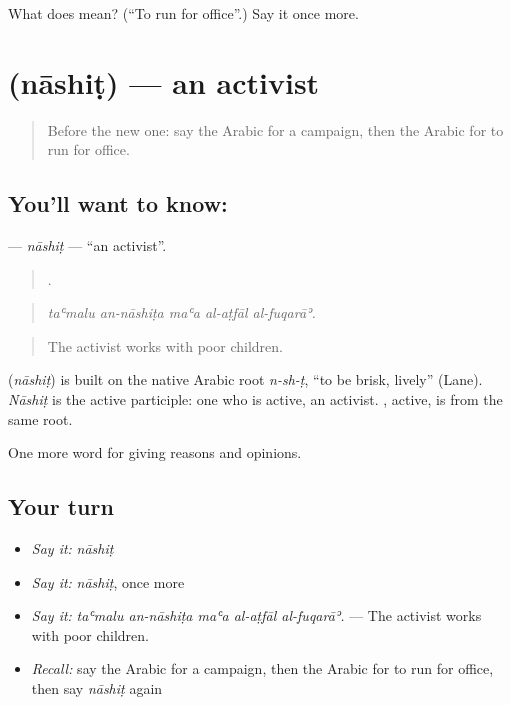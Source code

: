 \begin{tcolorbox}[breakable,colback=teal!4,colframe=teal!35!black,title={Before you move on}]
What does  mean? (\textquotedblleft{}To run for office\textquotedblright{}.) Say it once more.
\end{tcolorbox}
\section[\texorpdfstring{\ar{ناشط} (nāshiṭ)}{ناشط (nāshiṭ)}]{ (nāshiṭ) — an activist}

\label{lesson:AR-C379-nashit}



\begin{quote}
Before the new one: say the Arabic for a campaign, then the Arabic for to run for office.
\end{quote}

\subsection*{You'll want to know: }
\textbf{} — \emph{nāshiṭ} — \textquotedblleft{}an activist\textquotedblright{}.

\begin{quote}
    .
\end{quote}

\begin{quote}
\emph{taʿmalu an-nāshiṭa maʿa al-aṭfāl al-fuqarāʾ.}
\end{quote}

\begin{quote}
The activist works with poor children.
\end{quote}

\begin{cousinweb}
\textbf{} (\emph{nāshiṭ}) is built on the native Arabic root \emph{n-sh-ṭ}, \textquotedblleft{}to be brisk, lively\textquotedblright{} (Lane). \emph{Nāshiṭ} is the active participle: one who is active, an activist. , active, is from the same root.
\end{cousinweb}

\begin{grammarlens}[title={What you've built}]
One more word for giving reasons and opinions.
\end{grammarlens}

\subsection*{Your turn}
\begin{itemize}
\raggedright
  \item \emph{Say it:} \emph{nāshiṭ}
  \item \emph{Say it:} \emph{nāshiṭ}, once more
  \item \emph{Say it:} \emph{taʿmalu an-nāshiṭa maʿa al-aṭfāl al-fuqarāʾ.} — The activist works with poor children.
  \item \emph{Recall:} say the Arabic for a campaign, then the Arabic for to run for office, then say \emph{nāshiṭ} again
\end{itemize}

